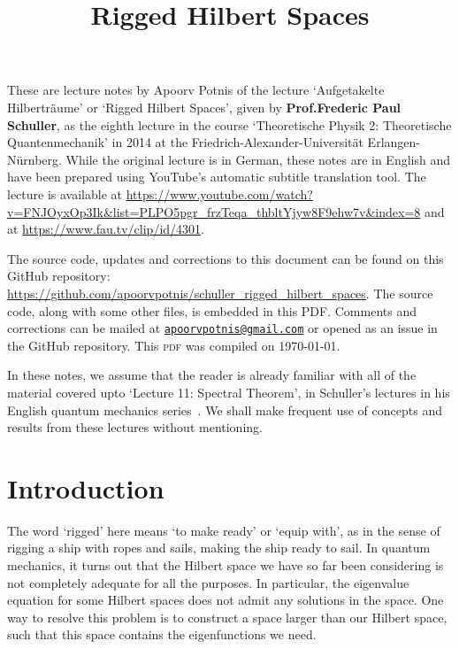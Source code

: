 \documentclass[12pt, a4 paper]{article}
\title{Rigged Hilbert Spaces}
\author{}
\date{\vspace{-5ex}}
\theoremstyle{definition}
\begin{document}
    \maketitle

    These are lecture notes by Apoorv Potnis of the lecture `Aufgetakelte Hilberträume' or `Rigged Hilbert Spaces', given by \textbf{Prof.\@ Frederic Paul Schuller}, as the eighth lecture in the course `Theoretische Physik 2: Theoretische Quantenmechanik' in 2014 at the Friedrich-Alexander-Universität Erlangen-Nürnberg. While the original lecture is in German, these notes are in English and have been prepared using YouTube's automatic subtitle translation tool. The lecture is available at \url{https://www.youtube.com/watch?v=FNJOyxOp3Ik&list=PLPO5pgr_frzTeqa_thbltYjyw8F9ehw7v&index=8} and at \url{https://www.fau.tv/clip/id/4301}.

    The source code, updates and corrections to this document can be found on this GitHub repository: \url{https://github.com/apoorvpotnis/schuller_rigged_hilbert_spaces}. The source code, along with some other files, is embedded in this PDF. Comments and corrections can be mailed at \href{mailto:apoorvpotnis@gmail.com}{\texttt{apoorvpotnis@gmail.com}} or opened as an issue in the GitHub repository. This \textsc{pdf} was compiled on \today.

    In these notes, we assume that the reader is already familiar with all of the material covered upto `Lecture 11: Spectral Theorem', in Schuller's lectures in his English quantum mechanics series~\cite{SchullerVideos, Schuller}. We shall make frequent use of concepts and results from these lectures without mentioning.

    \tableofcontents

    \section{Introduction}

    The word `rigged' here means `to make ready' or `equip with', as in the sense of rigging a ship with ropes and sails, making the ship ready to sail. In quantum mechanics, it turns out that the Hilbert space we have so far been considering is not completely adequate for all the purposes. In particular, the eigenvalue equation for some Hilbert spaces does not admit any solutions in the space. One way to resolve this problem is to construct a space larger than our Hilbert space, such that this space contains the eigenfunctions we need.
\end{document}
